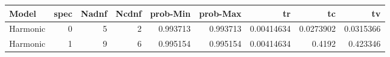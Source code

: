 \begin{tabular}{lrrrrrrrr}
\hline
 Model    &   spec &   Nadnf &   Ncdnf &   prob-Min &   prob-Max &         tr &        tc &        tv \\
\hline
 Harmonic &      0 &       5 &       2 &   0.993713 &   0.993713 & 0.00414634 & 0.0273902 & 0.0315366 \\
 Harmonic &      1 &       9 &       6 &   0.995154 &   0.995154 & 0.00414634 & 0.4192    & 0.423346  \\
\hline
\end{tabular}
